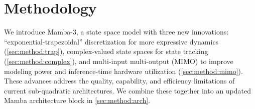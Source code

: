 \section{Methodology}

We introduce Mamba-3, a state space model with three new innovations:
``exponential-trapezoidal'' discretization for more expressive dynamics (\cref{sec:method:trap}),
complex-valued state spaces for state tracking (\cref{sec:method:complex}),
and multi-input multi-output (MIMO) to improve modeling power and inference-time hardware utilization (\cref{sec:method:mimo}).
These advances address the quality, capability, and efficiency limitations of current sub-quadratic architectures.
We combine these together into an updated Mamba architecture block in \cref{sec:method:arch}.





